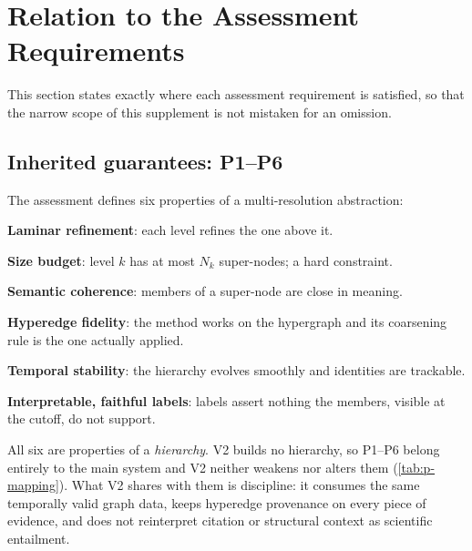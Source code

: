 \documentclass[11pt,a4paper]{article}
\newcommand{\cref}[1]{\autoref{#1}}
\theoremstyle{remark}
\begin{document}
\section{Relation to the Assessment Requirements}
\label{sec:assessment}

This section states exactly where each assessment requirement is satisfied, so that the
narrow scope of this supplement is not mistaken for an omission.

\subsection{Inherited guarantees: P1--P6}

The assessment defines six properties of a multi-resolution abstraction:

\begin{description}[leftmargin=1.2cm,style=nextline,itemsep=1pt]
  \item[P1] \textbf{Laminar refinement}: each level refines the one above it.
  \item[P2] \textbf{Size budget}: level $k$ has at most $N_k$ super-nodes; a hard constraint.
  \item[P3] \textbf{Semantic coherence}: members of a super-node are close in meaning.
  \item[P4] \textbf{Hyperedge fidelity}: the method works on the hypergraph and its
            coarsening rule is the one actually applied.
  \item[P5] \textbf{Temporal stability}: the hierarchy evolves smoothly and identities are
            trackable.
  \item[P6] \textbf{Interpretable, faithful labels}: labels assert nothing the members,
            visible at the cutoff, do not support.
\end{description}

All six are properties of a \emph{hierarchy}. V2 builds no hierarchy, so P1--P6 belong
entirely to the main system and V2 neither weakens nor alters them
(\cref{tab:p-mapping}). What V2 shares with them is discipline: it consumes the same
temporally valid graph data, keeps hyperedge provenance on every piece of evidence, and
does not reinterpret citation or structural context as scientific entailment.
\end{document}
